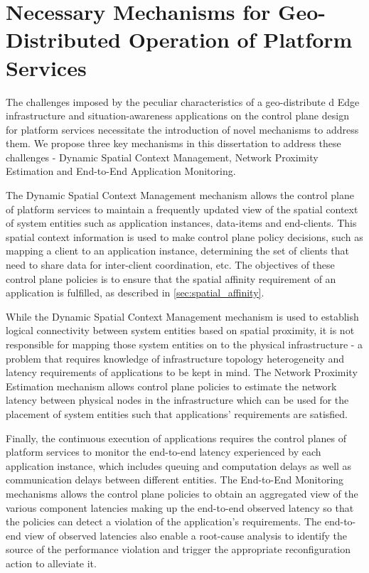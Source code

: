 \chapter{Necessary Mechanisms for Geo-Distributed Operation of Platform Services}

The challenges imposed by the peculiar characteristics of a geo-distribute d Edge infrastructure and situation-awareness applications on the control plane design for platform services necessitate the introduction of novel mechanisms to address them. We propose three key mechanisms in this dissertation to address these challenges - Dynamic Spatial Context Management, Network Proximity Estimation and End-to-End Application Monitoring. 
\par The Dynamic Spatial Context Management mechanism allows the control plane of platform services to maintain a frequently updated view of the spatial context of system entities such as application instances, data-items and end-clients. This spatial context information is used to make control plane policy decisions, such as mapping a client to an application instance, determining the set of clients that need to share data for inter-client coordination, etc. The objectives of these control plane policies is to ensure that the spatial affinity requirement of an application is fulfilled, as described in \cref{sec:spatial_affinity}.
\par While the Dynamic Spatial Context Management mechanism is used to establish logical connectivity between system entities based on spatial proximity, it is not responsible for mapping those system entities on to the physical infrastructure - a problem that requires knowledge of infrastructure topology heterogeneity and latency requirements of applications to be kept in mind. The Network Proximity Estimation mechanism allows control plane policies to estimate the network latency between physical nodes in the infrastructure which can be used for the placement of system entities such that applications' requirements are satisfied. 
\par Finally, the continuous execution of applications requires the control planes of platform services to monitor the end-to-end latency experienced by each application instance, which includes queuing and computation delays as well as communication delays between different entities. The End-to-End Monitoring mechanisms allows the control plane policies to obtain an aggregated view of the various component latencies making up the end-to-end observed latency so that the policies can detect a violation of the application's requirements. The end-to-end view of observed latencies also enable a root-cause analysis to identify the source of the performance violation and trigger the appropriate reconfiguration action to alleviate it. 
